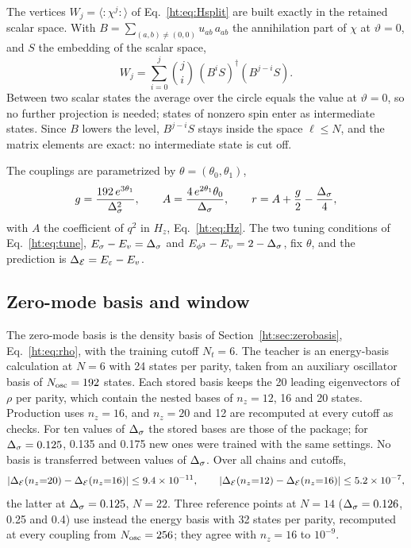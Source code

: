 The vertices $W_j=\langle{:}\chi^j{:}\rangle$ of Eq.~\eqref{ht:eq:Hsplit} are built exactly in the retained scalar space.
With $B=\sum_{(a,b)\neq(0,0)}u_{ab}\,a_{ab}$ the annihilation part of $\chi$ at $\vartheta=0$, and $S$ the embedding of
the scalar space,
\begin{equation}
 W_j=\sum_{i=0}^{j}\binom ji\,(B^iS)^\dagger(B^{j-i}S).
 \label{ht:d2:eq:W}
\end{equation}
Between two scalar states the average over the circle equals the value at $\vartheta=0$, so no further projection is
needed; states of nonzero spin enter as intermediate states. Since $B$ lowers the level, $B^{j-i}S$ stays inside the
space $\ell\le N$, and the matrix elements are exact: no intermediate state is cut off.

The couplings are parametrized by $\theta=(\theta_0,\theta_1)$,
\begin{equation}
 g=\frac{192\,e^{3\theta_1}}{\Delta_\sigma^2},\qquad A=\frac{4\,e^{2\theta_1}\theta_0}{\Delta_\sigma},\qquad
 r=A+\frac g2-\frac{\Delta_\sigma}4 ,
 \label{ht:d2:eq:theta}
\end{equation}
with $A$ the coefficient of $q^2$ in $H_z$, Eq.~\eqref{ht:eq:Hz}. The two tuning conditions of Eq.~\eqref{ht:eq:tune},
$E_\sigma-E_v=\Delta_\sigma$ and $E_{\phi^3}-E_v=2-\Delta_\sigma$, fix $\theta$, and the prediction is $\Delta_{\mathcal E}=E_\varepsilon-E_v$.

\subsection{Zero-mode basis and window}\label{ht:d2:basis}
The zero-mode basis is the density basis of Section~\ref{ht:sec:zerobasis}, Eq.~\eqref{ht:eq:rho}, with the training cutoff
$N_t=6$. The teacher is an energy-basis calculation at $N=6$ with 24 states per parity, taken from an auxiliary
oscillator basis of $N_{\rm osc}=192$ states. Each stored basis keeps the 20 leading eigenvectors of $\rho$ per parity,
which contain the nested bases of $n_z=12$, 16 and 20 states. Production uses $n_z=16$, and $n_z=20$ and 12 are
recomputed at every cutoff as checks. For ten values of $\Delta_\sigma$ the stored bases are those of the package; for
$\Delta_\sigma=0.125$, 0.135 and 0.175 new ones were trained with the same settings. No basis is transferred between values of
$\Delta_\sigma$. Over all chains and cutoffs,
\begin{equation*}
 |\Delta_{\mathcal E}(n_z{=}20)-\Delta_{\mathcal E}(n_z{=}16)|\le9.4\times10^{-11},\qquad |\Delta_{\mathcal E}(n_z{=}12)-\Delta_{\mathcal E}(n_z{=}16)|\le5.2\times10^{-7},
\end{equation*}
the latter at $\Delta_\sigma=0.125$, $N=22$. Three reference points at $N=14$ ($\Delta_\sigma=0.126$, 0.25 and 0.4) use instead the energy
basis with 32 states per parity, recomputed at every coupling from $N_{\rm osc}=256$; they agree with $n_z=16$ to
$10^{-9}$.

